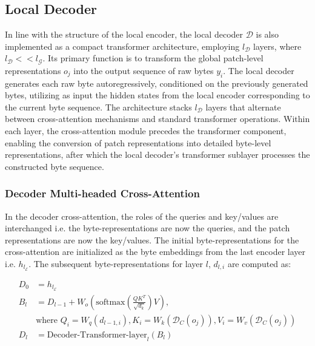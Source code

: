 \subsection{Local Decoder} 

In line with the structure of the local encoder, the local decoder $\mathcal{D}$ is also implemented as a compact transformer architecture, employing $l_{\mathcal{D}}$ layers, where $l_{\mathcal{D}} << l_{\mathcal{G}}$. Its primary function is to transform the global patch-level representations $o_j$ into the output sequence of raw bytes $y_i$. The local decoder generates each raw byte autoregressively, conditioned on the previously generated bytes, utilizing as input the hidden states from the local encoder corresponding to the current byte sequence. The architecture stacks $l_{\mathcal{D}}$ layers that alternate between cross-attention mechanisms and standard transformer operations. Within each layer, the cross-attention module precedes the transformer component, enabling the conversion of patch representations into detailed byte-level representations, after which the local decoder’s transformer sublayer processes the constructed byte sequence.

\subsubsection{Decoder Multi-headed Cross-Attention} 

In the decoder cross-attention, the roles of the queries and key/values are interchanged i.e. the byte-representations are now the queries, and the patch representations are now the key/values. The initial byte-representations for the cross-attention are initialized as the byte embeddings from the last encoder layer i.e. $h_{l_{\mathcal{E}}}$. The subsequent byte-representations for layer $l$, $d_{l,i}$ are computed as:

\begin{align}
D_0 &= h_{l_{\mathcal{E}}} \\
B_l &= D_{l-1} + W_o\left(\text{softmax}\left(\frac{QK^T}{\sqrt{d_k}}\right)V\right), \\
  &\text{where } Q_i = W_q(d_{l-1,i}), K_i = W_k(\mathcal{D}_C(o_j)), V_i = W_v(\mathcal{D}_C(o_j)) \\
  D_l &= \text{Decoder-Transformer-layer}_l(B_l)
\end{align}

